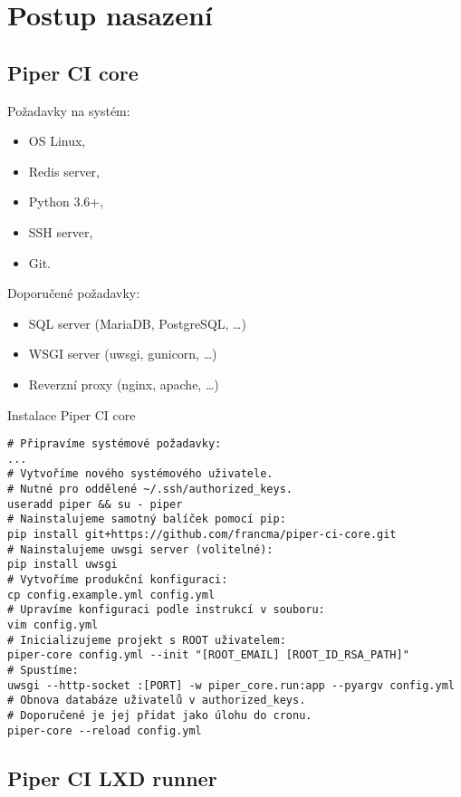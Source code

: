 \clearpage\section{Postup nasazení}

\subsection{Piper CI core}

Požadavky na systém:

\begin{itemize}
	\item OS Linux,
	\item Redis server,
	\item Python 3.6+,
	\item SSH server,
	\item Git.
\end{itemize}

Doporučené požadavky:

\begin{itemize}
	\item SQL server (MariaDB, PostgreSQL, \ldots)
	\item WSGI server (uwsgi, gunicorn, \ldots)
	\item Reverzní proxy (nginx, apache, \ldots)
\end{itemize}

\begin{listing}[H]
\caption{Instalace Piper CI core}
\begin{verbatim}
# Připravíme systémové požadavky:
...
# Vytvoříme nového systémového uživatele.
# Nutné pro oddělené ~/.ssh/authorized_keys.
useradd piper && su - piper
# Nainstalujeme samotný balíček pomocí pip:
pip install git+https://github.com/francma/piper-ci-core.git
# Nainstalujeme uwsgi server (volitelné):
pip install uwsgi
# Vytvoříme produkční konfiguraci:
cp config.example.yml config.yml
# Upravíme konfiguraci podle instrukcí v souboru:
vim config.yml
# Inicializujeme projekt s ROOT uživatelem:
piper-core config.yml --init "[ROOT_EMAIL] [ROOT_ID_RSA_PATH]"
# Spustíme:
uwsgi --http-socket :[PORT] -w piper_core.run:app --pyargv config.yml
# Obnova databáze uživatelů v authorized_keys.
# Doporučené je jej přidat jako úlohu do cronu.
piper-core --reload config.yml
\end{verbatim}
\end{listing}

\subsection{Piper CI LXD runner}

